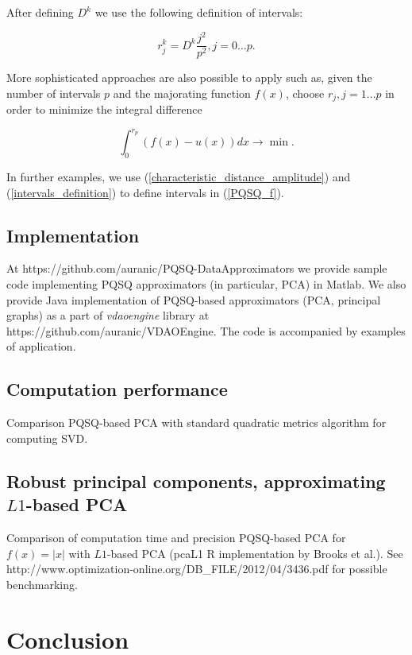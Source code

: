 \documentclass[preprint,12pt]{elsarticle}
\begin{document}
After defining $D^k$ we use the following definition of intervals:

\begin{equation}\label{intervals_definition}
r_j^k = D^k\frac{j^2}{p^2}, j=0\dots p.
\end{equation}

More sophisticated approaches are also possible to apply such as, given the number of intervals $p$ and the majorating function $f(x)$, choose $r_j, j=1\dots p$ in order to minimize the integral difference

$$
\int_0^{r_p}(f(x)-u(x))dx \rightarrow \min.
$$

In further examples, we use (\ref{characteristic_distance_amplitude}) and (\ref{intervals_definition}) to define intervals in (\ref{PQSQ_f}).

\subsection{Implementation}

At https://github.com/auranic/PQSQ-DataApproximators we provide sample code implementing PQSQ approximators (in particular, PCA) in Matlab. We also provide Java implementation of PQSQ-based approximators (PCA, principal graphs) as a part of \emph{vdaoengine} library at https://github.com/auranic/VDAOEngine. The code is accompanied by examples of application.



\subsection{Computation performance}

Comparison PQSQ-based PCA with standard quadratic metrics algorithm for computing SVD.

\subsection{Robust principal components, approximating $L1$-based PCA}

Comparison of computation time and precision PQSQ-based PCA for $f(x)=|x|$ with $L1$-based PCA (pcaL1 R implementation by Brooks et al.). See
http://www.optimization-online.org/DB\_FILE/2012/04/3436.pdf for possible benchmarking.




\section{Conclusion}
\end{document}
